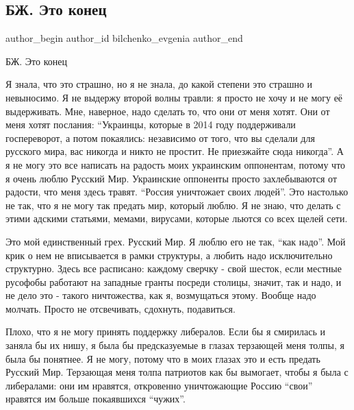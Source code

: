  
 
 
 
 
 
\subsection{БЖ. Это конец}
\label{sec:18_12_2021.fb.bilchenko_evgenia.1.eto_konec}
 
\ifcmt
 author_begin
   author_id bilchenko_evgenia
 author_end
\fi

БЖ. Это конец

Я знала, что это страшно, но я не знала, до какой степени это страшно и
невыносимо. Я не выдержу второй волны травли: я просто не хочу и не могу её
выдерживать. Мне, наверное, надо сделать то, что они от меня хотят. Они от меня
хотят послания: \enquote{Украинцы, которые в 2014 году поддерживали госпереворот, а
потом покаялись: независимо от того, что вы сделали для русского мира, вас
никогда и никто не простит. Не приезжайте сюда никогда}. А я не могу это все
написать на радость моих украинским оппонентам, потому что я очень люблю
Русский Мир. Украинские оппоненты просто захлебываются от радости, что меня
здесь травят. \enquote{Россия уничтожает своих людей}.  Это настолько не так, что я не
могу так предать мир, который люблю. Я не знаю, что делать с этими адскими
статьями, мемами, вирусами, которые льются со всех щелей сети.


Это мой единственный грех. Русский Мир. Я люблю его не так, \enquote{как надо}. Мой
крик о нем не вписывается в рамки структуры, а любить надо исключительно
структурно. Здесь все расписано: каждому сверчку - свой шесток, если местные
русофобы работают на западные гранты посреди столицы, значит, так и надо, и не
дело это - такого ничтожества, как я, возмущаться этому. Вообще надо молчать.
Просто не отсвечивать, сдохнуть, подавиться.

Плохо, что я не могу принять поддержку либералов. Если бы я смирилась и заняла
бы их нишу, я была бы предсказуемые в глазах терзающей меня толпы, я была бы
понятнее.  Я не могу, потому что в моих глазах это и есть предать Русский Мир.
Терзающая меня толпа патриотов как бы вымогает, чтобы я была с либералами: они
им нравятся, откровенно уничтожающие Россию \enquote{свои} нравятся им больше
покаявшихся \enquote{чужих}.


